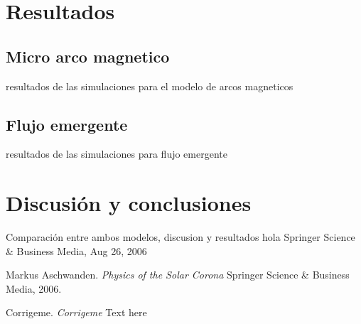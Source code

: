 \documentclass[9pt]{book}
\begin{document}
\chapter{Resultados}
\section{Micro arco magnetico}
resultados de las simulaciones para el modelo de arcos magneticos
\section{Flujo emergente}
resultados de las simulaciones para flujo emergente


\chapter{Discusi\'on y conclusiones}
Comparaci\'on entre ambos modelos, discusion y resultados
hola Springer Science \& Business Media, Aug 26, 2006

\begin{thebibliography}{9}

Markus Aschwanden. 
\textit{Physics of the Solar Corona} 
Springer Science \& Business Media, 2006.

Corrigeme. 
\textit{Corrigeme} 
Text here


\end{thebibliography}
\end{document}
